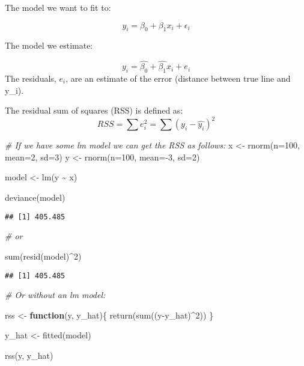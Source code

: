 \documentclass[
]{article}
\newenvironment{Shaded}{\begin{snugshade}}{\end{snugshade}}
\newcommand{\AttributeTok}[1]{\textcolor[rgb]{0.77,0.63,0.00}{#1}}
\newcommand{\CommentTok}[1]{\textcolor[rgb]{0.56,0.35,0.01}{\textit{#1}}}
\newcommand{\ControlFlowTok}[1]{\textcolor[rgb]{0.13,0.29,0.53}{\textbf{#1}}}
\newcommand{\DecValTok}[1]{\textcolor[rgb]{0.00,0.00,0.81}{#1}}
\newcommand{\FunctionTok}[1]{\textcolor[rgb]{0.00,0.00,0.00}{#1}}
\newcommand{\NormalTok}[1]{#1}
\newcommand{\OtherTok}[1]{\textcolor[rgb]{0.56,0.35,0.01}{#1}}
\newcommand{\SpecialCharTok}[1]{\textcolor[rgb]{0.00,0.00,0.00}{#1}}
\begin{document}
The model we want to fit to:

\[y_i=\beta_0+\beta_1x_i+\epsilon_i\]

The model we estimate:

\[y_i=\hat{\beta_0}+\hat{\beta_1}x_i+e_i\] The residuals, \(e_i\), are
an estimate of the error (distance between true line and y\_i).

The residual sum of squares (RSS) is defined as:
\[RSS=\sum e_i^2=\sum(y_i-\hat{y_i})^2\]

\begin{Shaded}
\begin{Highlighting}[]
\CommentTok{\# If we have some lm model we can get the RSS as follows:}
\NormalTok{x }\OtherTok{\textless{}{-}} \FunctionTok{rnorm}\NormalTok{(}\AttributeTok{n=}\DecValTok{100}\NormalTok{, }\AttributeTok{mean=}\DecValTok{2}\NormalTok{, }\AttributeTok{sd=}\DecValTok{3}\NormalTok{)}
\NormalTok{y }\OtherTok{\textless{}{-}} \FunctionTok{rnorm}\NormalTok{(}\AttributeTok{n=}\DecValTok{100}\NormalTok{, }\AttributeTok{mean=}\SpecialCharTok{{-}}\DecValTok{3}\NormalTok{, }\AttributeTok{sd=}\DecValTok{2}\NormalTok{)}

\NormalTok{model }\OtherTok{\textless{}{-}} \FunctionTok{lm}\NormalTok{(y }\SpecialCharTok{\textasciitilde{}}\NormalTok{ x)}

\FunctionTok{deviance}\NormalTok{(model)}
\end{Highlighting}
\end{Shaded}

\begin{verbatim}
## [1] 405.485
\end{verbatim}

\begin{Shaded}
\begin{Highlighting}[]
\CommentTok{\# or}

\FunctionTok{sum}\NormalTok{(}\FunctionTok{resid}\NormalTok{(model)}\SpecialCharTok{\^{}}\DecValTok{2}\NormalTok{)}
\end{Highlighting}
\end{Shaded}

\begin{verbatim}
## [1] 405.485
\end{verbatim}

\begin{Shaded}
\begin{Highlighting}[]
\CommentTok{\# Or without an lm model:}

\NormalTok{rss }\OtherTok{\textless{}{-}} \ControlFlowTok{function}\NormalTok{(y, y\_hat)\{}
  \FunctionTok{return}\NormalTok{(}\FunctionTok{sum}\NormalTok{((y}\SpecialCharTok{{-}}\NormalTok{y\_hat)}\SpecialCharTok{\^{}}\DecValTok{2}\NormalTok{))}
\NormalTok{\}}

\NormalTok{y\_hat }\OtherTok{\textless{}{-}} \FunctionTok{fitted}\NormalTok{(model)}

\FunctionTok{rss}\NormalTok{(y, y\_hat)}
\end{Highlighting}
\end{Shaded}
\end{document}
